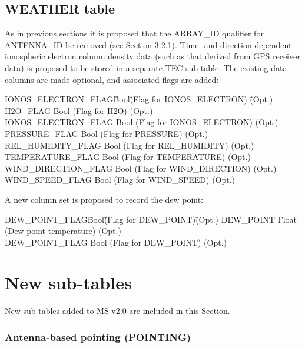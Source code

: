 \documentclass{article}
\begin{document}
\subsection{WEATHER table}

As in previous sections it is proposed that the ARRAY\_ID qualifier
for ANTENNA\_ID be removed (see Section 3.2.1). Time- and
direction-dependent ionospheric electron column density data (such as
that derived from GPS receiver data) is proposed to be stored in a
separate TEC sub-table. The existing data columns are made optional,
and associated flags are added:

\begin{tabbing}
IONOS\_ELECTRON\_FLAG\quad\quad \= Bool\quad\quad \= 
(Flag for IONOS\_ELECTRON) \quad\quad \= (Opt.) \\
H2O\_FLAG \> Bool \> (Flag for H2O) \> (Opt.) \\
IONOS\_ELECTRON\_FLAG \> Bool \> (Flag for IONOS\_ELECTRON) \> (Opt.) \\
PRESSURE\_FLAG \> Bool \> (Flag for PRESSURE) \> (Opt.) \\
REL\_HUMIDITY\_FLAG \> Bool \> (Flag for REL\_HUMIDITY) \> (Opt.) \\
TEMPERATURE\_FLAG \> Bool \> (Flag for TEMPERATURE) \> (Opt.) \\
WIND\_DIRECTION\_FLAG \> Bool \> (Flag for WIND\_DIRECTION) \> (Opt.) \\
WIND\_SPEED\_FLAG \> Bool \> (Flag for WIND\_SPEED) \> (Opt.) \\
\end{tabbing}

A new column set is proposed to record the dew point:

\begin{tabbing}
DEW\_POINT\_FLAG\quad\quad   \= Bool\quad\quad  \= 
(Flag for DEW\_POINT)\quad\quad \= (Opt.) \kill
DEW\_POINT \> Float \>  (Dew point temperature) \> (Opt.) \\
DEW\_POINT\_FLAG   \> Bool  \> (Flag for DEW\_POINT) \> (Opt.) \\
\end{tabbing}


\section{New sub-tables}

New sub-tables added to MS v2.0 are included in this Section.

\subsubsection{Antenna-based pointing (POINTING)}
\end{document}
